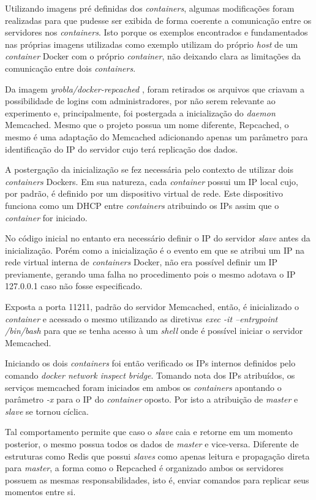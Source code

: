 \documentclass[conference]{IEEEtran}
\begin{document}
Utilizando imagens pré definidas dos \textit{containers}, algumas modificações foram realizadas para que pudesse ser exibida de forma coerente a comunicação entre os servidores nos \textit{containers}. Isto porque os exemplos encontrados e fundamentados nas próprias imagens utilizadas como exemplo utilizam do próprio \textit{host} de um \textit{container} Docker com o próprio \textit{container}, não deixando clara as limitações da comunicação entre dois \textit{containers}.

Da imagem \textit{yrobla/docker-repcached} \cite{yrobla}, foram retirados os arquivos que criavam a possibilidade de logins com administradores, por não serem relevante ao experimento e, principalmente, foi postergada a inicialização do \textit{daemon} Memcached. Mesmo que o projeto possua um nome diferente, Repcached, o mesmo é uma adaptação do Memcached adicionando apenas um parâmetro para identificação do IP do servidor cujo terá replicação dos dados.

A postergação da inicialização se fez necessária pelo contexto de utilizar dois \textit{containers} Dockers. Em sua natureza, cada \textit{container} possui um IP local cujo, por padrão, é definido por um dispositivo virtual de rede. Este dispositivo funciona como um DHCP entre \textit{containers} atribuindo os IPs assim que o \textit{container} for iniciado.

No código inicial no entanto era necessário definir o IP do servidor \textit{slave} antes da inicialização. Porém como a inicialização é o evento em que se atribui um IP na rede virtual interna de \textit{containers} Docker, não era possível definir um IP previamente, gerando uma falha no procedimento pois o mesmo adotava o IP 127.0.0.1 caso não fosse especificado.

Exposta a porta 11211, padrão do servidor Memcached, então, é inicializado o \textit{container} e acessado o mesmo utilizando as diretivas \textit{exec -it --entrypoint /bin/bash} para que se tenha acesso à um \textit{shell} onde é possível iniciar o servidor Memcached. 

Iniciando os dois \textit{containers} foi então verificado os IPs internos definidos pelo comando \textit{docker network inspect bridge}. Tomando nota dos IPs atribuídos, os serviços memcached foram iniciados em ambos os \textit{containers} apontando o parâmetro \textit{-x} para o IP do \textit{container} oposto. Por isto a atribuição de \textit{master} e \textit{slave} se tornou cíclica.

Tal comportamento permite que caso o \textit{slave} caia e retorne em um momento posterior, o mesmo possua todos os dados de \textit{master} e vice-versa. Diferente de estruturas como Redis que possui \textit{slaves} como apenas leitura e propagação direta para \textit{master}, a forma como o Repcached é organizado ambos os servidores possuem as mesmas responsabilidades, isto é, enviar comandos para replicar seus momentos entre si.
\end{document}
